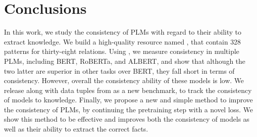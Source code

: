 \section{Conclusions}
\label{sec:conclusions}

In this work, we study the consistency of PLMs with regard to their ability to extract knowledge.
We build a high-quality resource named \resource{}, that contain 328 patterns for thirty-eight relations.
Using \resource{}, we measure consistency in multiple PLMs, including BERT, RoBERTa, and ALBERT, and show that although the two latter are superior in other tasks over BERT, they fall short in terms of consistency. However, overall the consistency ability of these models is low.
We release \resource{} along with data tuples from \cite{trex} as a new benchmark, to track the consistency of models to knowledge.
Finally, we propose a new and simple method to improve the consistency of PLMs, by continuing the pretraining step with a novel loss. We show this method to be effective and improves both the consistency of models as well as their ability to extract the correct facts.
